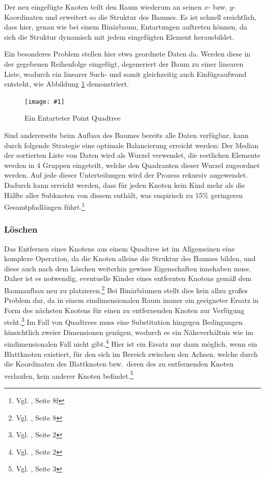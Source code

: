 \documentclass[%
			paper=a4,%
			DIV12,
			liststotoc,
			bibtotoc,
			draft=false,%
			titlepage,
			numbers=noendperiod
			]{scrartcl}
\newcommand{\zit}[3]{#1 \cite{#2}, #3}
\newcommand{\footzit}[3]{\footnote{\zit{#1}{#2}{#3}}}
\newcommand{\myfig}[5] {
 \begin{figure}[tbph]
	 \centering
	 \texttt{[image: \#1]}
	 \caption[#4]{#5}
	 \label{fig:#2}
 \end{figure}
}
\begin{document}
Der neu eingefügte Knoten teilt den Raum wiederum an seinen $x$- bzw. $y$-Koordinaten und erweitert so die Struktur des Baumes.  
Es ist schnell ersichtlich, dass hier, genau wie bei einem Binärbaum, Entartungen auftreten können, da sich die Struktur dynamisch mit jedem eingefügten Element herausbildet.

Ein besonderes Problem stellen hier etwa geordnete Daten da. Werden diese in der gegebenen Reihenfolge eingefügt, degeneriert der Baum zu einer linearen Liste, wodurch ein linearer Such- und somit gleichzeitig auch Einfügeaufwand entsteht, wie Abbildung \ref{fig:entartung} demonstriert.
\myfig{img/pointquadtree-entartet-trimmed}{entartung}{width=.6\textwidth}{Entarteter Point Quadtree}{Ein Entarteter Point Quadtree}

Sind andererseits beim Aufbau des Baumes bereits alle Daten verfügbar, kann durch folgende Strategie eine optimale Balancierung erreicht werden: Der Median der sortierten Liste von Daten wird als Wurzel verwendet, die restlichen Elemente werden in 4 Gruppen eingeteilt, welche den Quadranten dieser Wurzel zugeordnet werden.
Auf jede dieser Unterteilungen wird der Prozess rekursiv angewendet. Dadurch kann erreicht werden, dass für jeden Knoten kein Kind mehr als die Hälfte aller Subknoten von diesem enthält, was empirisch zu 15\% geringeren Gesamtpfadlängen führt.\footzit{Vgl.}{DBLP:journals/acta/FinkelB74}{Seite 8f}


\subsubsection{Löschen}
\label{sec:pointquadtree:delete}
Das Entfernen eines Knotens aus einem Quadtree ist im Allgemeinen eine komplexe Operation, da die Knoten alleine die Struktur des Baumes bilden, und diese auch nach dem Löschen weiterhin gewisse Eigenschaften innehaben muss.
Daher ist es notwendig, eventuelle Kinder eines entfernten Knotens gemäß dem Baumaufbau neu zu platzieren.\footzit{Vgl.}{DBLP:journals/acta/FinkelB74}{Seite 8}
Bei Binärbäumen stellt dies kein allzu großes Problem dar, da in einem eindimensionalen Raum immer ein geeigneter Ersatz in Form des nächsten Knotens für einen zu entfernenden Knoten zur Verfügung steht.\footzit{Vgl.}{DBLP:journals/cacm/Samet80a}{Seite 2}
Im Fall von Quadtrees muss eine Substitution hingegen Bedingungen hinsichtlich zweier Dimensionen genügen, wodurch es ein Näheverhältnis wie im eindimensionalen Fall nicht gibt.\footzit{Vgl.}{DBLP:journals/cacm/Samet80a}{Seite 2}
Hier ist ein Ersatz nur dann möglich, wenn ein Blattknoten existiert, für den sich im Bereich zwischen den Achsen, welche durch die Koordinaten des Blattknoten bzw.\ deren des zu entfernenden Knoten verlaufen, kein anderer Knoten befindet.\footzit{Vgl.}{DBLP:journals/cacm/Samet80a}{Seite 3}
\end{document}
